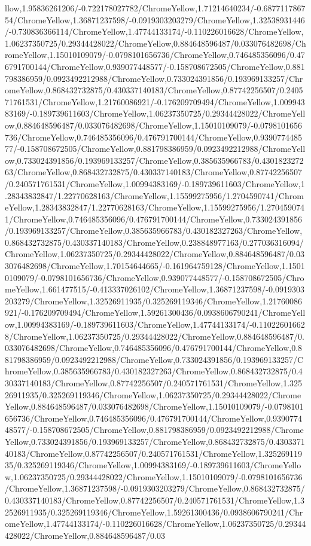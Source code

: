 {\begin{tikzternal}
llow,1.95836261206/-0.722178027782/ChromeYellow,1.71214640234/-0.687711786754/ChromeYellow,1.36871237598/-0.0919303203279/ChromeYellow,1.32538931446/-0.730836366114/ChromeYellow,1.47744133174/-0.110226016628/ChromeYellow,1.06237350725/0.29344428022/ChromeYellow,0.884648596487/0.033076482698/ChromeYellow,1.15010109079/-0.0798101656736/ChromeYellow,0.746485356096/0.476791700144/ChromeYellow,0.939077448577/-0.158708672505/ChromeYellow,0.881798386959/0.0923492212988/ChromeYellow,0.733024391856/0.193969133257/ChromeYellow,0.868432732875/0.430337140183/ChromeYellow,0.87742256507/0.240571761531/ChromeYellow,1.21760086921/-0.176209709494/ChromeYellow,1.00994383169/-0.189739611603/ChromeYellow,1.06237350725/0.29344428022/ChromeYellow,0.884648596487/0.033076482698/ChromeYellow,1.15010109079/-0.0798101656736/ChromeYellow,0.746485356096/0.476791700144/ChromeYellow,0.939077448577/-0.158708672505/ChromeYellow,0.881798386959/0.0923492212988/ChromeYellow,0.733024391856/0.193969133257/ChromeYellow,0.385635966783/0.430182327263/ChromeYellow,0.868432732875/0.430337140183/ChromeYellow,0.87742256507/0.240571761531/ChromeYellow,1.00994383169/-0.189739611603/ChromeYellow,1.28343832847/1.22770628163/ChromeYellow,1.15599275956/1.2704590741/ChromeYellow,1.28343832847/1.22770628163/ChromeYellow,1.15599275956/1.2704590741/ChromeYellow,0.746485356096/0.476791700144/ChromeYellow,0.733024391856/0.193969133257/ChromeYellow,0.385635966783/0.430182327263/ChromeYellow,0.868432732875/0.430337140183/ChromeYellow,0.238848977163/0.277036316094/ChromeYellow,1.06237350725/0.29344428022/ChromeYellow,0.884648596487/0.033076482698/ChromeYellow,1.70154644665/-0.161964759128/ChromeYellow,1.15010109079/-0.0798101656736/ChromeYellow,0.939077448577/-0.158708672505/ChromeYellow,1.661477515/-0.413337026102/ChromeYellow,1.36871237598/-0.0919303203279/ChromeYellow,1.32526911935/0.325269119346/ChromeYellow,1.21760086921/-0.176209709494/ChromeYellow,1.59261300436/0.0938606790241/ChromeYellow,1.00994383169/-0.189739611603/ChromeYellow,1.47744133174/-0.110226016628/ChromeYellow,1.06237350725/0.29344428022/ChromeYellow,0.884648596487/0.033076482698/ChromeYellow,0.746485356096/0.476791700144/ChromeYellow,0.881798386959/0.0923492212988/ChromeYellow,0.733024391856/0.193969133257/ChromeYellow,0.385635966783/0.430182327263/ChromeYellow,0.868432732875/0.430337140183/ChromeYellow,0.87742256507/0.240571761531/ChromeYellow,1.32526911935/0.325269119346/ChromeYellow,1.06237350725/0.29344428022/ChromeYellow,0.884648596487/0.033076482698/ChromeYellow,1.15010109079/-0.0798101656736/ChromeYellow,0.746485356096/0.476791700144/ChromeYellow,0.939077448577/-0.158708672505/ChromeYellow,0.881798386959/0.0923492212988/ChromeYellow,0.733024391856/0.193969133257/ChromeYellow,0.868432732875/0.430337140183/ChromeYellow,0.87742256507/0.240571761531/ChromeYellow,1.32526911935/0.325269119346/ChromeYellow,1.00994383169/-0.189739611603/ChromeYellow,1.06237350725/0.29344428022/ChromeYellow,1.15010109079/-0.0798101656736/ChromeYellow,1.36871237598/-0.0919303203279/ChromeYellow,0.868432732875/0.430337140183/ChromeYellow,0.87742256507/0.240571761531/ChromeYellow,1.32526911935/0.325269119346/ChromeYellow,1.59261300436/0.0938606790241/ChromeYellow,1.47744133174/-0.110226016628/ChromeYellow,1.06237350725/0.29344428022/ChromeYellow,0.884648596487/0.03
\end{tikzternal}}
